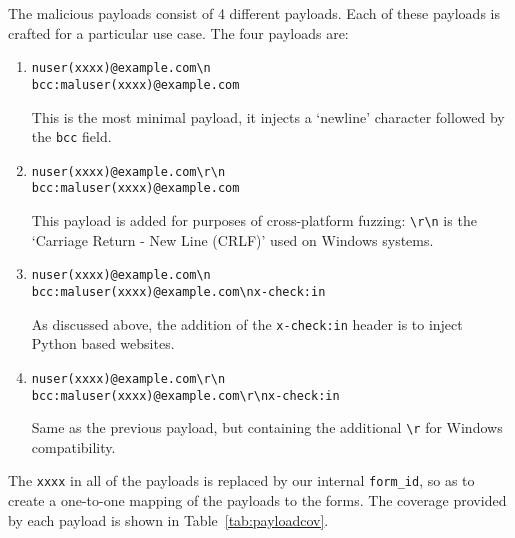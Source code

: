 The malicious payloads consist of 4 different payloads. Each of these payloads is crafted for a particular use case. The four payloads are:

\begin{enumerate}
	\item
	\texttt{nuser(xxxx)@example.com\textbackslash{}n\\bcc:maluser(xxxx)@example.com} 
	
	This is the most minimal payload, it injects a `newline' character followed by the \texttt{bcc} field.
	
	\item \texttt{nuser(xxxx)@example.com\textbackslash{}r\textbackslash{}n\\bcc:maluser(xxxx)@example.com}
	
	This payload is added for purposes of cross-platform fuzzing: \texttt{\textbackslash{}r\textbackslash{}n} is the `Carriage Return - New Line (CRLF)' used on Windows systems. 
	
	\item \texttt{nuser(xxxx)@example.com\textbackslash{}n\\bcc:maluser(xxxx)@example.com\textbackslash{}nx-check:in}
	
	As discussed above, the addition of the \texttt{x-check:in} header is to inject Python based websites.
	
	\item \texttt{nuser(xxxx)@example.com\textbackslash{}r\textbackslash{}n\\bcc:maluser(xxxx)@example.com\textbackslash{}r\textbackslash{}nx-check:in}
	
	Same as the previous payload, but containing the additional \texttt{\textbackslash{}r} for Windows compatibility.
	
\end{enumerate}
The \texttt{xxxx} in all of the payloads is replaced by our internal \texttt{form\_id}, so as to create a one-to-one mapping of the payloads to the forms. The coverage provided by each payload is shown in Table~\ref{tab:payloadcov}.\\

